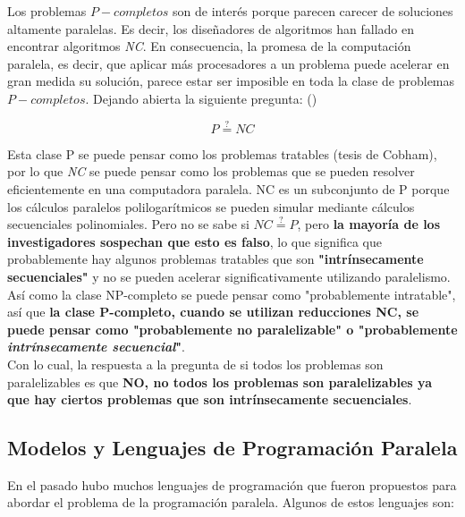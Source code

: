 Los problemas $P-completos$ son de interés porque parecen carecer de soluciones altamente paralelas. Es decir, los
diseñadores de algoritmos han fallado en encontrar algoritmos \textit{NC}. En consecuencia, la promesa de la computación
paralela, es decir, que aplicar más procesadores a un problema puede acelerar en gran medida su solución, parece estar
ser imposible en toda la clase de problemas $P-completos$. Dejando abierta la siguiente pregunta:
(\textcite{greenlaw1995})

\[
  P \stackrel{?}{=} NC
\]

Esta clase P se puede pensar como los problemas tratables (tesis de Cobham), por lo que \textit{NC} se puede pensar como
los problemas que se pueden resolver eficientemente en una computadora paralela. NC es un subconjunto de P porque los
cálculos paralelos polilogarítmicos se pueden simular mediante cálculos secuenciales polinomiales. Pero no se sabe si
$NC \stackrel{?}{=} P$, pero \textbf{la mayoría de los investigadores sospechan que esto es falso}, lo que significa que
probablemente hay algunos problemas tratables que son \textbf{"intrínsecamente secuenciales"} y no se pueden acelerar
significativamente utilizando paralelismo. Así como la clase NP-completo se puede pensar como "probablemente
intratable", así que \textbf{la clase P-completo, cuando se utilizan reducciones NC, se puede pensar como "probablemente
no paralelizable" o "probablemente \textit{intrínsecamente secuencial}"}. \\

Con lo cual, la respuesta a la pregunta de si todos los problemas son paralelizables es que \textbf{NO, no todos los
problemas son paralelizables ya que hay ciertos problemas que son intrínsecamente secuenciales}.

\subsection{Modelos y Lenguajes de Programación Paralela}

En el pasado hubo muchos lenguajes de programación que fueron propuestos para abordar el problema de la programación
paralela. Algunos de estos lenguajes son:

